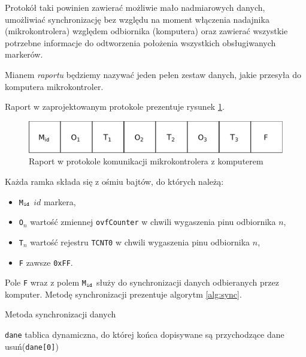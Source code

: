 Protokół taki powinien zawierać możliwie mało nadmiarowych danych, umożliwiać synchronizację bez względu na moment włączenia nadajnika (mikrokontrolera) względem odbiornika (komputera) oraz zawierać wszystkie potrzebne informacje do odtworzenia położenia wszystkich obsługiwanych markerów.

Mianem \emph{raportu} będziemy nazywać jeden pełen zestaw danych, jakie przesyła do komputera mikrokontroler.

Raport w zaprojektowanym protokole prezentuje rysunek \ref{fig:protocol}.

\begin{figure}
 \includegraphics[width=\textwidth]{gfx/diagramy/protokol.pdf}
 \caption[Schemat raportu]{Raport w protokole komunikacji mikrokontrolera z komputerem}
 \label{fig:protocol}
\end{figure}

Każda ramka składa się z ośmiu bajtów, do których należą:
\begin{itemize}
 \item \texttt{M$_\textrm{\texttt{id}}$} \ppauza $id$ markera,
 \item \texttt{O$_n$} \ppauza wartość zmiennej \texttt{ovfCounter} w chwili wygaszenia pinu odbiornika $n$,
 \item \texttt{T$_n$} \ppauza wartość rejestru \texttt{TCNT0} w chwili wygaszenia pinu odbiornika $n$,
 \item \texttt{F} \ppauza zawsze \texttt{0xFF}.
\end{itemize}

Pole \texttt{F} wraz z polem \texttt{M$_\textrm{\texttt{id}}$} służy do synchronizacji danych odbieranych przez komputer. Metodę synchronizacji prezentuje algorytm \ref{alg:sync}.

\begin{algorithm}
\caption{Metoda synchronizacji danych}
\label{alg:sync}
\begin{algorithmic}[1]
  \REQUIRE \texttt{dane} \ppauza tablica dynamiczna, do której końca dopisywane są przychodzące dane
      \STATE usuń(\texttt{dane[0]})
    \ENDWHILE
  \ENDWHILE
\end{algorithmic}
\end{algorithm}

